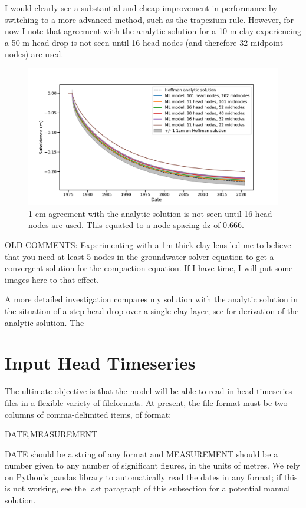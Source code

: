 \documentclass{article}
\begin{document}
I would clearly see a substantial and cheap improvement in performance by switching to a more advanced method, such as the trapezium rule. However, for now I note that agreement with the analytic solution for a 10 m clay experiencing a 50 m head drop is not seen until 16 head nodes (and therefore 32 midpoint nodes) are used.

\begin{figure}
\includegraphics[width=\linewidth]{Benchmark_Output_Comparisons_StepDrop.pdf}
\caption{1 cm agreement with the analytic solution is not seen until 16 head nodes are used. This equated to a node spacing dz of 0.666.}
\label{fig:overburden1}
\end{figure}

OLD COMMENTS:
Experimenting with a 1m thick clay lens led me to believe that you need at least 5 nodes in the groundwater solver equation to get a convergent solution for the compaction equation. If I have time, I will put some images here to that effect.

A more detailed investigation compares my solution with the analytic solution in the situation of a step head drop over a single clay layer; see \cite{hoffmann_inverse_2003} for derivation of the analytic solution. The 

\section{Input Head Timeseries}

The ultimate objective is that the model will be able to read in head timeseries files in a flexible variety of fileformats. At present, the file format must be two columns of comma-delimited items, of format:

DATE,MEASUREMENT

DATE should be a string of any format and MEASUREMENT should be a number given to any number of significant figures, in the units of metres. We rely on Python's pandas library to automatically read the dates in any format; if this is not working, see the last paragraph of this subsection for a potential manual solution.
\end{document}
